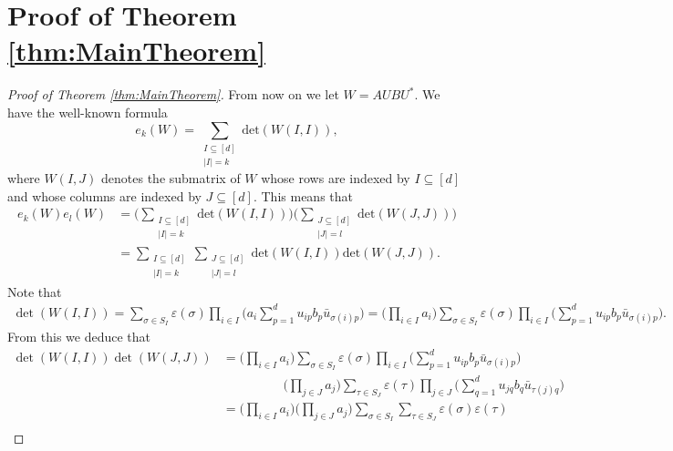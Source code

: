 \documentclass[11pt, a4paper, oneside, reqno]{amsart}
\theoremstyle{remark}
\theoremstyle{definition}
\numberwithin{equation}{section}
\begin{document}
\section{Proof of Theorem \ref{thm:MainTheorem}}
\label{sec:ProofMainTheorem}
\begin{proof}[Proof of Theorem \ref{thm:MainTheorem}]
From now on we let $W = AUBU^*$. We have the well-known formula
$$
	e_k(W) = \sum_{\substack{I \subseteq [d]\\ |I| = k}} \text{det}(W(I,I)),
$$
where $W(I,J)$ denotes the submatrix of $W$ whose rows are indexed by $I\subseteq [d]$ and whose columns are indexed by $J \subseteq [d]$. This means that
\begin{align*}
	e_k(W)e_l(W) & = \Big(\sum_{\substack{I \subseteq [d] \\ |I| = k}} \text{det}(W(I,I))\Big)\Big(\sum_{\substack{J \subseteq [d]\\ |J| = l}} \text{det}(W(J,J))\Big) \\
	                             & = \sum_{\substack{I \subseteq [d]      \\ |I| = k}} \sum_{\substack{J \subseteq [d]\\ |J| = l}} \text{det}(W(I,I))\text{det}(W(J,J)).
\end{align*}
Note that
\begin{align*}
	\det(W(I,I))
	= \sum_{\sigma \in S_I} \varepsilon(\sigma) \prod_{i\in I}\Big(a_{i}\sum_{p=1}^d u_{ip}b_p\bar{u}_{\sigma(i)p}\Big)
	= \Big(\prod_{i\in I}a_{i} \Big)\sum_{\sigma \in S_I} \varepsilon(\sigma) \prod_{i \in I}\Big(\sum_{p=1}^d u_{ip}b_p\bar{u}_{\sigma(i)p}\Big).
\end{align*}
From this we deduce that
\begin{align*}
	\det(W(I,I))\det(W(J,J))
	 & = \Big(\prod_{i\in I}a_{i} \Big)\sum_{\sigma \in S_I} \varepsilon(\sigma) \prod_{i \in I}\Big(\sum_{p=1}^d u_{ip}b_p\bar{u}_{\sigma(i)p}\Big)                                                                                         \\
	 & \hspace{2cm}\Big(\prod_{j\in J}a_{j} \Big)\sum_{\tau \in S_J} \varepsilon(\tau) \prod_{j \in J}\Big(\sum_{q=1}^d u_{jq}b_q\bar{u}_{\tau(j)q}\Big)                                                                              \\
	 & = \Big(\prod_{i\in I}a_{i}\Big)\Big(\prod_{j\in J}a_{j}\Big)\sum_{\sigma \in S_I} \sum_{\tau \in S_J} \varepsilon(\sigma)\varepsilon(\tau)                                                                                            \\

\end{align*}
\end{proof}
\end{document}
